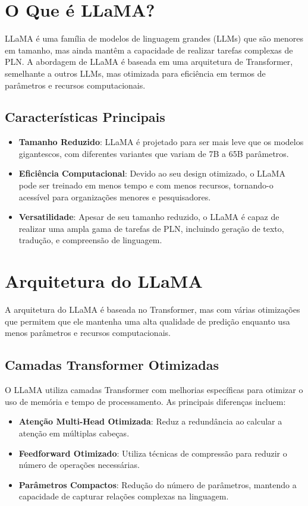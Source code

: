 \documentclass[14pt,a4paper,oneside]{book}
\begin{document}
\section{O Que é LLaMA?}

LLaMA é uma família de modelos de linguagem grandes (LLMs) que são menores em tamanho, mas ainda mantêm a capacidade de realizar tarefas complexas de PLN. A abordagem de LLaMA é baseada em uma arquitetura de Transformer, semelhante a outros LLMs, mas otimizada para eficiência em termos de parâmetros e recursos computacionais.

\subsection{Características Principais}

\begin{itemize}
	\item \textbf{Tamanho Reduzido}: LLaMA é projetado para ser mais leve que os modelos gigantescos, com diferentes variantes que variam de 7B a 65B parâmetros.
	\item \textbf{Eficiência Computacional}: Devido ao seu design otimizado, o LLaMA pode ser treinado em menos tempo e com menos recursos, tornando-o acessível para organizações menores e pesquisadores.
	\item \textbf{Versatilidade}: Apesar de seu tamanho reduzido, o LLaMA é capaz de realizar uma ampla gama de tarefas de PLN, incluindo geração de texto, tradução, e compreensão de linguagem.
\end{itemize}

\section{Arquitetura do LLaMA}

A arquitetura do LLaMA é baseada no Transformer, mas com várias otimizações que permitem que ele mantenha uma alta qualidade de predição enquanto usa menos parâmetros e recursos computacionais.

\subsection{Camadas Transformer Otimizadas}

O LLaMA utiliza camadas Transformer com melhorias específicas para otimizar o uso de memória e tempo de processamento. As principais diferenças incluem:

\begin{itemize}
	\item \textbf{Atenção Multi-Head Otimizada}: Reduz a redundância ao calcular a atenção em múltiplas cabeças.
	\item \textbf{Feedforward Otimizado}: Utiliza técnicas de compressão para reduzir o número de operações necessárias.
	\item \textbf{Parâmetros Compactos}: Redução do número de parâmetros, mantendo a capacidade de capturar relações complexas na linguagem.
\end{itemize}
\end{document}

